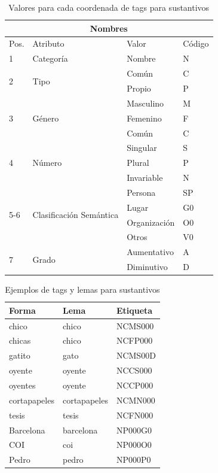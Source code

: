 \begin{center}
\begin{table}
\centering
\begin{tabular}{| l | l | l | l |}
 \hline
 \multicolumn{4}{|c|}{Nombres} \\ \hline
Pos. & Atributo & Valor & Código \\ \hline
1 & Categoría &  Nombre & N \\ \hline
\multirow{2}{*}{2} & \multirow{2}{*}{Tipo} & Común  & C \\ \cline{3-4}
  & &      Propio & P \\ \hline
\multirow{3}{*}{3} & \multirow{3}{*}{Género} & Masculino & M \\ \cline{3-4}
 & & Femenino &  F \\ \cline{3-4}
 & & Común    & C  \\ \hline
\multirow{3}{*}{4} & \multirow{3}{*}{Número} & Singular & S \\ \cline{3-4}
 & & Plural &  P \\ \cline{3-4}
 & & Invariable & N  \\ \hline
 \multirow{4}{*}{5-6} & \multirow{4}{*}{Clasificación Semántica} & Persona & SP \\ \cline{3-4}
 & & Lugar &  G0 \\ \cline{3-4}
 & & Organización &  O0 \\ \cline{3-4}
 & & Otros & V0  \\ \hline
\multirow{2}{*}{7} & \multirow{2}{*}{Grado} & Aumentativo  & A \\ \cline{3-4}
  & & Diminutivo & D \\ \hline
\end{tabular}
\caption{Valores para cada coordenada de tags para sustantivos}
\label{tabla_2_4}
\end{table}
\end{center}


\begin{center}
\begin{table}
\centering
\begin{tabular}{| l | l | l |}
 \hline
Forma & Lema & Etiqueta \\ \hline
chico & chico & NCMS000 \\ \hline
chicas & chico & NCFP000 \\ \hline
gatito & gato & NCMS00D \\ \hline
oyente & oyente & NCCS000 \\ \hline
oyentes & oyente & NCCP000 \\ \hline
cortapapeles & cortapapeles &NCMN000 \\ \hline
tesis & tesis & NCFN000 \\ \hline
Barcelona & barcelona & NP000G0 \\ \hline
COI & coi & NP000O0 \\ \hline
Pedro & pedro & NP000P0 \\ \hline
\end{tabular}
\caption{Ejemplos de tags y lemas para sustantivos}
\label{tabla_2_5}
\end{table}
\end{center}


